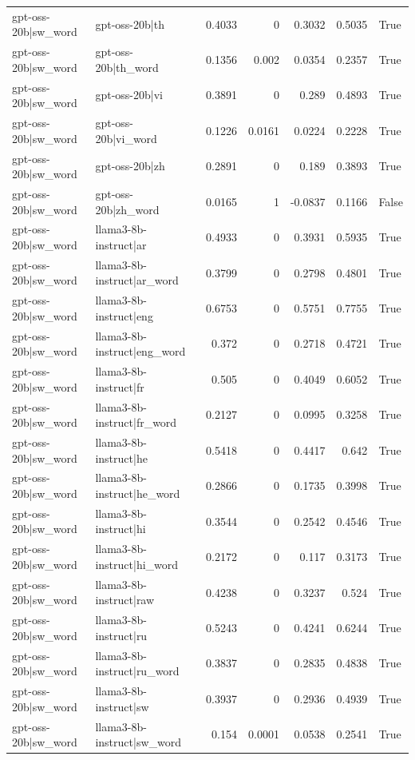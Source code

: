 \begin{table}
\begin{tabular}{l l r r r r l}
gpt-oss-20b|sw_word & gpt-oss-20b|th & 0.4033 & 0 & 0.3032 & 0.5035 & True \\
gpt-oss-20b|sw_word & gpt-oss-20b|th_word & 0.1356 & 0.002 & 0.0354 & 0.2357 & True \\
gpt-oss-20b|sw_word & gpt-oss-20b|vi & 0.3891 & 0 & 0.289 & 0.4893 & True \\
gpt-oss-20b|sw_word & gpt-oss-20b|vi_word & 0.1226 & 0.0161 & 0.0224 & 0.2228 & True \\
gpt-oss-20b|sw_word & gpt-oss-20b|zh & 0.2891 & 0 & 0.189 & 0.3893 & True \\
gpt-oss-20b|sw_word & gpt-oss-20b|zh_word & 0.0165 & 1 & -0.0837 & 0.1166 & False \\
gpt-oss-20b|sw_word & llama3-8b-instruct|ar & 0.4933 & 0 & 0.3931 & 0.5935 & True \\
gpt-oss-20b|sw_word & llama3-8b-instruct|ar_word & 0.3799 & 0 & 0.2798 & 0.4801 & True \\
gpt-oss-20b|sw_word & llama3-8b-instruct|eng & 0.6753 & 0 & 0.5751 & 0.7755 & True \\
gpt-oss-20b|sw_word & llama3-8b-instruct|eng_word & 0.372 & 0 & 0.2718 & 0.4721 & True \\
gpt-oss-20b|sw_word & llama3-8b-instruct|fr & 0.505 & 0 & 0.4049 & 0.6052 & True \\
gpt-oss-20b|sw_word & llama3-8b-instruct|fr_word & 0.2127 & 0 & 0.0995 & 0.3258 & True \\
gpt-oss-20b|sw_word & llama3-8b-instruct|he & 0.5418 & 0 & 0.4417 & 0.642 & True \\
gpt-oss-20b|sw_word & llama3-8b-instruct|he_word & 0.2866 & 0 & 0.1735 & 0.3998 & True \\
gpt-oss-20b|sw_word & llama3-8b-instruct|hi & 0.3544 & 0 & 0.2542 & 0.4546 & True \\
gpt-oss-20b|sw_word & llama3-8b-instruct|hi_word & 0.2172 & 0 & 0.117 & 0.3173 & True \\
gpt-oss-20b|sw_word & llama3-8b-instruct|raw & 0.4238 & 0 & 0.3237 & 0.524 & True \\
gpt-oss-20b|sw_word & llama3-8b-instruct|ru & 0.5243 & 0 & 0.4241 & 0.6244 & True \\
gpt-oss-20b|sw_word & llama3-8b-instruct|ru_word & 0.3837 & 0 & 0.2835 & 0.4838 & True \\
gpt-oss-20b|sw_word & llama3-8b-instruct|sw & 0.3937 & 0 & 0.2936 & 0.4939 & True \\
gpt-oss-20b|sw_word & llama3-8b-instruct|sw_word & 0.154 & 0.0001 & 0.0538 & 0.2541 & True \\

\end{tabular}
\end{table}
